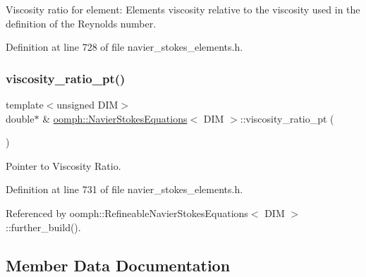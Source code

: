 Viscosity ratio for element\+: Element\textquotesingle{}s viscosity relative to the viscosity used in the definition of the Reynolds number. 



Definition at line 728 of file navier\+\_\+stokes\+\_\+elements.\+h.

\mbox{\label{classoomph_1_1NavierStokesEquations_a99a9507dd255fca305ec65220bcf7e3c}} 
\subsubsection{\texorpdfstring{viscosity\+\_\+ratio\+\_\+pt()}{viscosity\_ratio\_pt()}}
{\footnotesize\ttfamily template$<$unsigned D\+IM$>$ \\
double$\ast$ \& \hyperlink{classoomph_1_1NavierStokesEquations}{oomph\+::\+Navier\+Stokes\+Equations}$<$ D\+IM $>$\+::viscosity\+\_\+ratio\+\_\+pt (\begin{DoxyParamCaption}{ }\end{DoxyParamCaption})\hspace{0.3cm}{\ttfamily [inline]}}



Pointer to Viscosity Ratio. 



Definition at line 731 of file navier\+\_\+stokes\+\_\+elements.\+h.



Referenced by oomph\+::\+Refineable\+Navier\+Stokes\+Equations$<$ D\+I\+M $>$\+::further\+\_\+build().



\subsection{Member Data Documentation}
\mbox{\label{classoomph_1_1NavierStokesEquations_aea9eb3444fda78c89f9ba0557f98525d}} 
